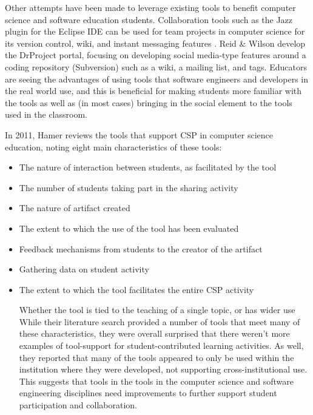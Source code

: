 \begin{itemize}
Other attempts have been made to leverage existing tools to benefit computer science and software education students. Collaboration tools such as the Jazz plugin for the Eclipse IDE can be used for team projects in computer science for its version control, wiki, and instant messaging features \cite{meneely2009preparing}. Reid \& Wilson \cite{reid2007drproject} develop the DrProject portal, focusing on developing social media-type features around a coding repository (Subversion) such as a wiki, a mailing list, and tags. Educators are seeing the advantages of using tools that software engineers and developers in the real world use, and this is beneficial for making students more familiar with the tools as well as (in most cases) bringing in the social element to the tools used in the classroom.

In 2011, Hamer \cite{hamer2011tools} reviews the tools that support CSP in computer science education, noting eight main characteristics of these tools:
\begin{itemize}
\item The nature of interaction between students, as facilitated by the tool
\item The number of students taking part in the sharing activity
\item The nature of artifact created
\item The extent to which the use of the tool has been evaluated
\item Feedback mechanisms from students to the creator of the artifact
\item Gathering data on student activity
\item The extent to which the tool facilitates the entire CSP activity

Whether the tool is tied to the teaching of a single topic, or has wider use
While their literature search provided a number of tools that meet many of these characteristics, they were overall surprised that there weren’t more examples of tool-support for student-contributed learning activities. As well, they reported that many of the tools appeared to only be used within the institution where they were developed, not supporting cross-institutional use. This suggests that tools in the tools in the computer science and software engineering disciplines need improvements to further support student participation and collaboration.


\end{itemize}
\end{itemize}
